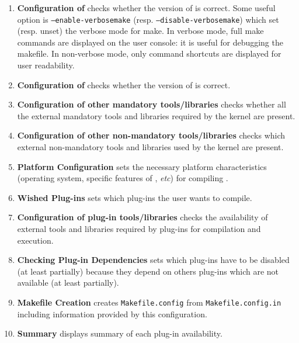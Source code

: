 \begin{enumerate}
\item \textbf{Configuration of \make} checks whether the version of \make is
  correct. Some useful option is \texttt{--enable-verbosemake} (resp.
  \texttt{--disable-verbosemake}) which set (resp. unset) the verbose mode for
  make. In verbose mode, full make commands are displayed on the user console:
  it is useful for debugging the makefile. In non-verbose mode, only command
  shortcuts are displayed for user readability.
\item \textbf{Configuration of \caml} checks whether the version of \caml is
  correct.
\item \textbf{Configuration of other mandatory tools/libraries} checks
  whether all the external mandatory tools and libraries required by the
  \framac kernel are
  present.
\item \textbf{Configuration of other non-mandatory tools/libraries} checks
  which external non-mandatory tools and libraries used by the \framac kernel
  are present.
\item \textbf{Platform Configuration} sets the necessary platform
  characteristics (operating system, specific features of \gcc, \emph{etc}) for
  compiling \framac.
\item \textbf{Wished \framac Plug-ins} sets which \framac plug-ins the user wants
  to compile.
\item \textbf{Configuration of plug-in tools/libraries} checks the
  availability of external tools and libraries required by plug-ins for
  compilation and
  execution.
\item \textbf{Checking Plug-in Dependencies} sets which plug-ins have to be
  disabled (at least partially) because they depend on others plug-ins which are
  not available (at least partially).
\item \textbf{Makefile Creation} creates \texttt{Makefile.config} from
  \texttt{Makefile.config.in} including information
  provided by this configuration.
\item \textbf{Summary} displays summary of each plug-in availability.
\end{enumerate}


